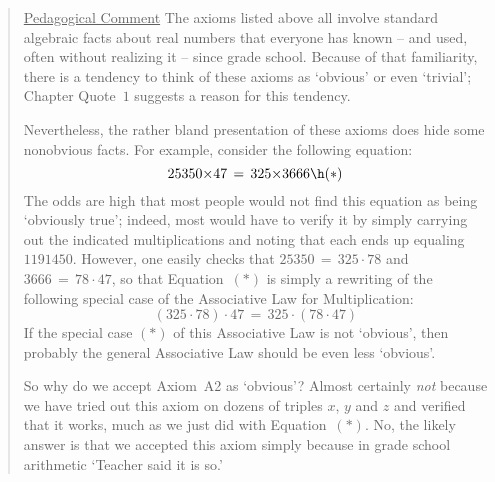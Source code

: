 {\begin{quotation}
{\footnotesize \underline{Pedagogical Comment}
    The axioms listed above all involve standard algebraic facts about real numbers that everyone has known -- and used, often without realizing it -- since grade school.
    Because of that familiarity, there is a tendency to think of these axioms as `obvious' or even `trivial';
    Chapter Quote~$1$ suggests a reason for this tendency.

        Nevertheless, the rather bland presentation of these axioms does hide some nonobvious facts.
    For example, consider the following equation:
        \begin{displaymath}
        25350{\times}47 \,=\, 325{\times}3666 \h ({\ast})
        \end{displaymath}
    The odds are high that most people would not find this equation as being `obviously true';
    indeed, most would have to verify it by simply carrying out the indicated multiplications and noting that each ends up equaling~$1191450$.
    However, one easily checks that $25350 \,=\, 325{\cdot}78$ and $3666 \,=\, 78{\cdot}47$,
     so that Equation~$({\ast})$ is simply a rewriting of the following special case of the Associative Law for Multiplication:
        \begin{displaymath}
        (325{\cdot}78){\cdot}47 \,=\, 325{\cdot}(78{\cdot}47)
        \end{displaymath}
    If the special case $({\ast})$ of this Associative Law is not `obvious', then probably the general Associative Law should be even less `obvious'.

        So why do we accept Axiom~A2 as `obvious'? Almost certainly {\em not} because
    we have tried out this axiom on dozens of triples $x$, $y$ and $z$ and verified that it works, much as we just did with Equation~$({\ast})$.
    No, the likely answer is that we accepted this axiom simply because in grade  school arithmetic `Teacher said it is so.'
}%
\end{quotation}

\V
\V
}%

